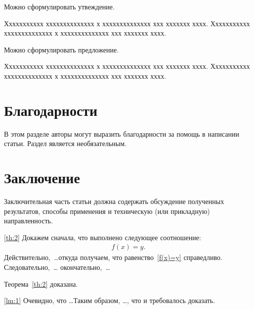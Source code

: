 \documentclass[12pt]{a&t}
\begin{document}
Можно сформулировать утвеждение.

\begin{statement}
Ххххххххххх хххххххххххххх х хххххххххххххх ххх ххххххх хххх.
Ххххххххххх хххххххххххххх х хххххххххххххх ххх ххххххх хххх.
\end{statement}

Можно сформулировать предложение.

\begin{proposition}
Ххххххххххх хххххххххххххх х хххххххххххххх ххх ххххххх хххх.
Ххххххххххх хххххххххххххх х хххххххххххххх ххх ххххххх хххх.
\end{proposition}

\section{Благодарности}
В этом разделе авторы могут выразить благодарности за помощь в написании статьи.
Раздел является необязательным.

\section{Заключение}
Заключительная часть статьи должна содержать обсуждение полученных результатов, способы применения и техническую (или прикладную) направленность.


\begin{proofoftheorem}{\ref{th:2}}
Докажем сначала, что выполнено следующее соотношение:
\begin{gather} \label{f(x)=y}
    f(x)=y.
\end{gather}
Действительно,~\dots откуда получаем, что
равенство~\eqref{f(x)=y} справедливо. Следовательно,~\dots
окончательно,~\dots

Теорема~\ref{th:2} доказана.
\end{proofoftheorem}

\begin{proofoflemma}{\ref{lm:1}}
Очевидно, что \dots Таким образом, \dots, что и требовалось
доказать.
\end{proofoflemma}

\cite{first}
\end{document}
